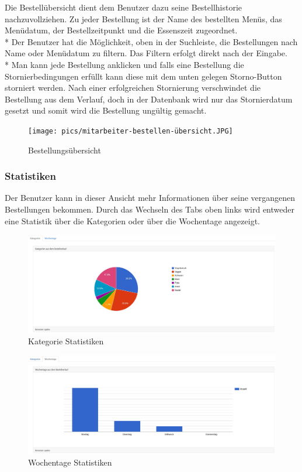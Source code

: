 Die Bestellübersicht dient dem Benutzer dazu seine Bestellhistorie nachzuvollziehen. Zu jeder Bestellung ist der Name des bestellten Menüs, das Menüdatum, der Bestellzeitpunkt und die Essenszeit zugeordnet. \\*
Der Benutzer hat die Möglichkeit, oben in der Suchleiste, die Bestellungen nach Name oder Menüdatum zu filtern. Das Filtern erfolgt direkt nach der Eingabe. \\*
Man kann jede Bestellung anklicken und falls eine Bestellung die Stornierbedingungen erfüllt kann diese mit dem unten gelegen Storno-Button storniert werden.
Nach einer erfolgreichen Stornierung verschwindet die Bestellung aus dem Verlauf, doch in der Datenbank wird nur das Stornierdatum gesetzt und somit wird die Bestellung ungültig gemacht. 


\begin{figure}[htp]
    \centering
    \texttt{[image: pics/mitarbeiter-bestellen-übersicht.JPG]}
    \caption{Bestellungsübersicht}
    \label{fig:impl:BestellenMitarbeiterUebersicht}
\end{figure}
\pagebreak

\subsubsection {Statistiken}

Der Benutzer kann in dieser Ansicht mehr Informationen über seine vergangenen Bestellungen bekommen.
Durch das Wechseln des Tabs oben links wird entweder eine Statistik über die Kategorien oder über die Wochentage angezeigt.

\begin{figure}[htp]
    \centering
    \includegraphics[scale=0.3]{pics/statistiken_kategorien.JPG}
    \caption{Kategorie Statistiken}
    \label{fig:impl:StatsCategories}
\end{figure}

\begin{figure}[htp]
    \centering
    \includegraphics[scale=0.3]{pics/statistiken_wochentage.JPG}
    \caption{Wochentage Statistiken}
    \label{fig:impl:WeekDaysCategories}
\end{figure}

